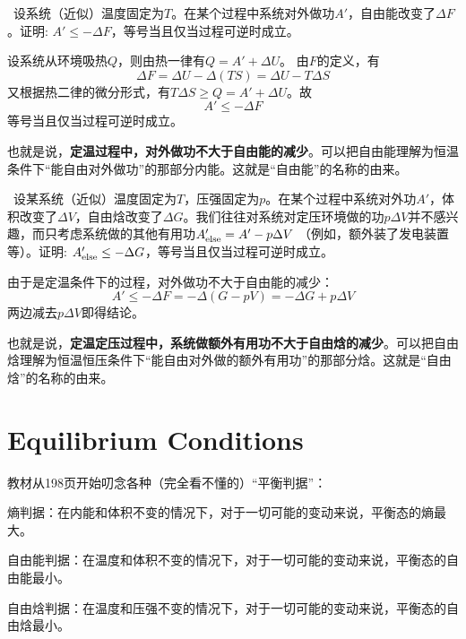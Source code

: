 \documentclass[CJK]{beamer}
\begin{document}
\begin{frame}
\bch
{\small
{\blue  设系统（近似）温度固定为$T$。在某个过程中系统对外做功$A'$，自由能改变了$\Delta F$。证明: $A'\le -\Delta F$，等号当且仅当过程可逆时成立。}

设系统从环境吸热$Q$，则由热一律有$Q = A' + \Delta U$。
由$F$的定义，有
$$\Delta F = \Delta U - \Delta (TS) = \Delta U - T\Delta S $$
又根据热二律的微分形式，有$T\Delta S \ge Q = A' +\Delta U$。故
$$A' \le - \Delta F$$
等号当且仅当过程可逆时成立。

也就是说，{\bf 定温过程中，对外做功不大于自由能的减少}。可以把自由能理解为恒温条件下“能自由对外做功”的那部分内能。这就是“自由能”的名称的由来。
}

\ech
\end{frame}

\begin{frame}
\bch

{\blue  设某系统（近似）温度固定为$T$，压强固定为$p$。在某个过程中系统对外功$A'$，体积改变了$\Delta V$，自由焓改变了$\Delta G$。我们往往对系统对定压环境做的功$p\Delta V$并不感兴趣，而只考虑系统做的其他有用功$A'_{\rm else} = A'-p\Delta V$ （例如，额外装了发电装置等）。证明: $A'_{\rm else}  \le -\Delta G$，等号当且仅当过程可逆时成立。}

由于是定温条件下的过程，对外做功不大于自由能的减少：
$$ A' \le - \Delta F = -\Delta (G- pV) = - \Delta G + p \Delta V$$
两边减去$p\Delta V$即得结论。

也就是说，{\bf 定温定压过程中，系统做额外有用功不大于自由焓的减少}。可以把自由焓理解为恒温恒压条件下“能自由对外做的额外有用功”的那部分焓。这就是“自由焓”的名称的由来。

\ech
\end{frame}

\section{Equilibrium Conditions}


\begin{frame}
\bch
教材从198页开始叨念各种（完全看不懂的）“平衡判据”：

\bitem
\item{熵判据：在内能和体积不变的情况下，对于一切可能的变动来说，平衡态的熵最大。}
\item{自由能判据：在温度和体积不变的情况下，对于一切可能的变动来说，平衡态的自由能最小。}
\item{自由焓判据：在温度和压强不变的情况下，对于一切可能的变动来说，平衡态的自由焓最小。}
\eitem

\ech
\end{frame}
\end{document}
